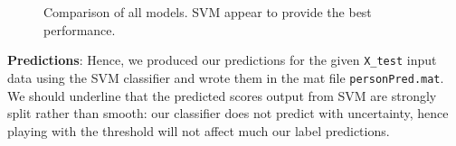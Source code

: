 \documentclass[10pt,a4paper]{article}
\begin{document}
   \begin{figure}[ht]
       \center
    	\hfill
	\caption{Comparison of all models. SVM appear to provide the best performance.}
  \end{figure}

  \textbf{Predictions}: Hence, we produced our predictions for the given \texttt{X\_test} input data using the SVM classifier and wrote them in the mat file \texttt{personPred.mat}. We should underline that the predicted scores output from SVM are strongly split rather than smooth: our classifier does not predict with uncertainty, hence playing with the threshold will not affect much our label predictions.
\end{document}
